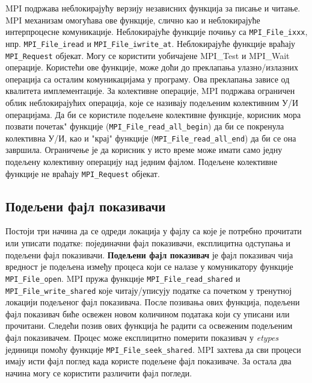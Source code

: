 MPI подржава неблокирајућу верзију независних функција за писање и читање. MPI механизам омогућава ове функције, слично као и неблокирајуће интерпроцесне комуникације. Неблокирајуће функције почињу са 
\texttt{MPI\_File\_ixxx}, нпр.  \texttt{MPI\_File\_iread} и \texttt{MPI\_File\_iwrite\_at}. Неблокирајуће функције враћају \texttt{MPI\_Request} објекат. Могу се користити уобичајене MPI\_Test и MPI\_Wait операције. Користећи ове функције, може доћи до преклапања улазно/излазних операција са осталим комуникацијама у програму. Ова преклапања зависе од квалитета имплементације. За колективне операције, MPI подржава 
ограничен облик неблокирајућих операција, које се називају подељеним колективним У/И операцијама. Да би се користиле подељене колективне функције, корисник мора позвати \zn почетак" функције (\texttt{MPI\_File\_read\_all\_begin}) да би се покренула колективна У/И, као и "крај" функције (\texttt{MPI\_File\_read\_all\_end}) да би се она завршила. Ограничење је да корисник у исто време може имати само једну подељену колективну операцију над једним фајлом. Подељене колективне функције не враћају \texttt{MPI\_Request} објекат.

\subsection{Подељени фајл показивачи}

Постоји три начина да се одреди локација у фајлу са које је потребно прочитати или уписати податке: појединачни фајл показивачи, експлицитна одступања и подељени фајл показивачи.
\textbf{Подељени фајл показивач} је фајл показивач чија вредност је подељена између процеса који се налазе у комуникатору функције \texttt{MPI\_File\_open}. MPI пружа функције \texttt{MPI\_File\_read\_shared} и \texttt{MPI\_File\_write\_shared} које читају/уписују податке са почетком у тренутној локацији подељеног фајл показивача. После позивања ових функција, подељени фајл показивач биће освежен новом количином података који су уписани или прочитани. Следећи позив ових функција ће радити са освеженим подељеним фајл показивачем. Процес може експлицитно померити показивач у \textit{etypes} јединици помоћу функције \texttt{MPI\_File\_seek\_shared}. MPI захтева да сви процеси имају исти фајл поглед када користе подељене фајл показиваче. За остала два начина могу се користити различити фајл погледи. 

